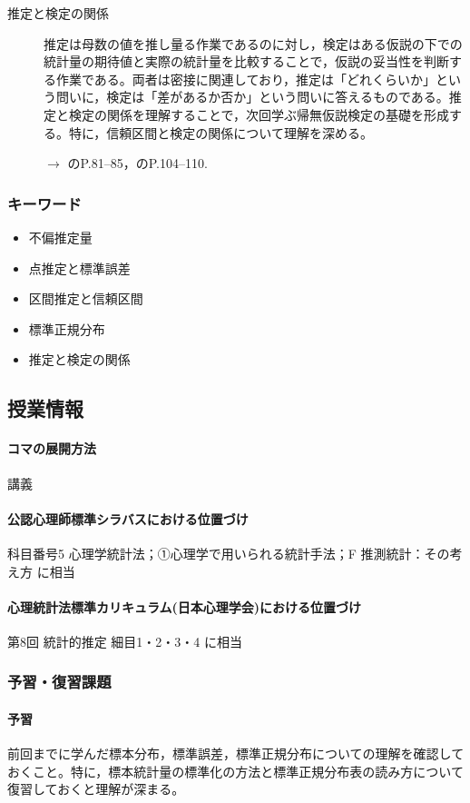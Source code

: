 \begin{description}
	\item[推定と検定の関係] 推定は母数の値を推し量る作業であるのに対し，検定はある仮説の下での統計量の期待値と実際の統計量を比較することで，仮説の妥当性を判断する作業である。両者は密接に関連しており，推定は「どれくらいか」という問いに，検定は「差があるか否か」という問いに答えるものである。推定と検定の関係を理解することで，次回学ぶ帰無仮説検定の基礎を形成する。特に，信頼区間と検定の関係について理解を深める。
	      \begin{flushright}
		      $\to$ \textcite{Kawabata201408}のP.81--85，\textcite{Yamada2004}のP.104--110.
	      \end{flushright}

\end{description}
\subsubsection{キーワード}
\begin{itemize}
	\item 不偏推定量
	\item 点推定と標準誤差
	\item 区間推定と信頼区間
	\item 標準正規分布
	\item 推定と検定の関係
\end{itemize}
\subsection{授業情報}
\paragraph{コマの展開方法}
講義
\paragraph{公認心理師標準シラバスにおける位置づけ}
科目番号5 心理学統計法；①心理学で用いられる統計手法；F 推測統計：その考え方 に相当
\paragraph{心理統計法標準カリキュラム(日本心理学会)における位置づけ}
第8回 統計的推定 細目1・2・3・4 に相当
\subsubsection{予習・復習課題}
\paragraph{予習}
前回までに学んだ標本分布，標準誤差，標準正規分布についての理解を確認しておくこと。特に，標本統計量の標準化の方法と標準正規分布表の読み方について復習しておくと理解が深まる。
